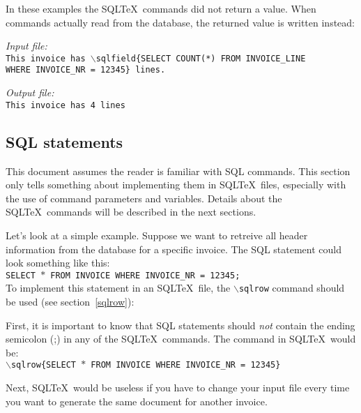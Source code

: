\documentclass{article}
\newcommand{\bs}{\ensuremath{\backslash}}
\newcommand{\vs}{\vspace{3mm}}
\begin{document}
\vs

In these examples the SQL\TeX\ commands did not return a value. When commands actually read from
the database, the returned value is written instead:

\vs

\begin{minipage}[t]{0.5\textwidth}\textsl{Input file:}\\\texttt{\footnotesize{This invoice has \bs sqlfield\{SELECT COUNT(*) FROM INVOICE\_LINE \\
WHERE INVOICE\_NR = 12345\} lines.\\
\hrulefill}}\end{minipage}\hfill\begin{minipage}[t]{0.5\textwidth}\textsl{Output file:}\\\texttt{\footnotesize{This invoice has 4 lines \\
}}\end{minipage}

\subsection{SQL statements}\label{sqlstatements}

This document assumes the reader is familiar with SQL commands. This section only tells something about
implementing them in SQL\TeX\ files, especially with the use of command parameters and variables.
Details about the SQL\TeX\ commands will be described in the next sections.

\vs

Let's look at a simple example. Suppose we want to retreive all header information from the database
for a specific invoice. The SQL statement could look something like this: \\
\texttt{SELECT $\ast$ FROM INVOICE WHERE INVOICE\_NR = 12345;}\\
To implement this statement in an SQL\TeX\ file, the \texttt{\bs sqlrow} command should be used (see
section~\ref{sqlrow}):

First, it is important to know that SQL statements should \textit{not} contain the ending semicolon (;) in
any of the SQL\TeX\ commands. The command in SQL\TeX\ would be:\\
\texttt{\bs sqlrow\{SELECT $\ast$ FROM INVOICE WHERE INVOICE\_NR = 12345\}}

Next, SQL\TeX\ would be useless if you have to change your input file every time you want to generate
the same document for another invoice.
\end{document}
